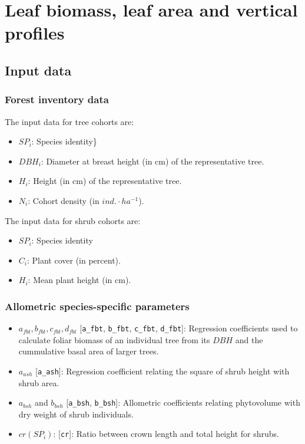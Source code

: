 \documentclass[]{book}
\providecommand{\tightlist}{%
  \setlength{\itemsep}{0pt}\setlength{\parskip}{0pt}}
\begin{document}
\hypertarget{leafbiomass}{%
\chapter{Leaf biomass, leaf area and vertical profiles}\label{leafbiomass}}

\hypertarget{input-data}{%
\section{Input data}\label{input-data}}

\hypertarget{forest-inventory-data}{%
\subsection{Forest inventory data}\label{forest-inventory-data}}

The input data for tree cohorts are:

\begin{itemize}
\tightlist
\item
  \(SP_i\): Species identity\}
\item
  \(DBH_i\): Diameter at breast height (in cm) of the representative tree.
\item
  \(H_i\): Height (in cm) of the representative tree.
\item
  \(N_i\): Cohort density (in \(ind.\cdot ha^{-1}\)).
\end{itemize}

The input data for shrub cohorts are:

\begin{itemize}
\tightlist
\item
  \(SP_i\): Species identity
\item
  \(C_i\): Plant cover (in percent).
\item
  \(H_i\): Mean plant height (in cm).
\end{itemize}

\hypertarget{allometric-species-specific-parameters}{%
\subsection{Allometric species-specific parameters}\label{allometric-species-specific-parameters}}

\begin{itemize}
\tightlist
\item
  \(a_{fbt}, b_{fbt}, c_{fbt}, d_{fbt}\) {[}\texttt{a\_fbt}, \texttt{b\_fbt}, \texttt{c\_fbt}, \texttt{d\_fbt}{]}: Regression coefficients used to calculate foliar biomass of an individual tree from its \(DBH\) and the cummulative basal area of larger trees.
\item
  \(a_{ash}\) {[}\texttt{a\_ash}{]}: Regression coefficient relating the square of shrub height with shrub area.
\item
  \(a_{bsh}\) and \(b_{bsh}\) {[}\texttt{a\_bsh}, \texttt{b\_bsh}{]}: Allometric coefficients relating phytovolume with dry weight of shrub individuals.
\item
  \(cr(SP_i)\): {[}\texttt{cr}{]}: Ratio between crown length and total height for shrubs.
\end{itemize}
\end{document}
